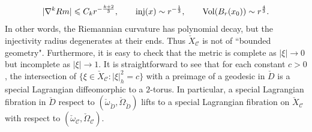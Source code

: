 \documentclass[11pt]{amsart}
\theoremstyle{plain}
\theoremstyle{definition}
\numberwithin{equation}{section}
\renewcommand{\leq}{\leqslant}
\begin{document}
\begin{equation}\label{eq: geomTY}
	|\nabla^k Rm|\leq C_k r^{-\frac{k+2}{3}}, \qquad     {\rm inj}(x) \sim r^{-\frac{1}{3}}, \qquad {\rm Vol}(B_{r}(x_0)) \sim r^{\frac{4}{3}}.
\end{equation}In other words, the Riemannian curvature has polynomial decay, but the injectivity radius degenerates at their ends. Thus $\check{X}_{\mathcal{C}}$ is not of ``bounded geometry".  Furthermore, it is easy to check that the metric is complete as $|\xi|\rightarrow 0$ but incomplete as $|\xi|\rightarrow 1$. It is straightforward to see that for each constant $c>0$, the intersection of $\{\xi\in \check{X}_{\mathcal{C}}:|\xi|^2_h=c\}$ with a preimage of a geodesic in $\check{D}$ is a special Lagrangian diffeomorphic to a $2$-torus. In particular, a special Lagrangian fibration in $\check{D}$ respect to $(\check{\omega}_{\check{D}},\check{\Omega}_{\check{D}})$ lifts to a special Lagrangian fibration on $\check{X}_{\mathcal{C}}$ with respect to $(\check{\omega}_{\mathcal{C}},\check{\Omega}_{\mathcal{C}})$. 
\end{document}
